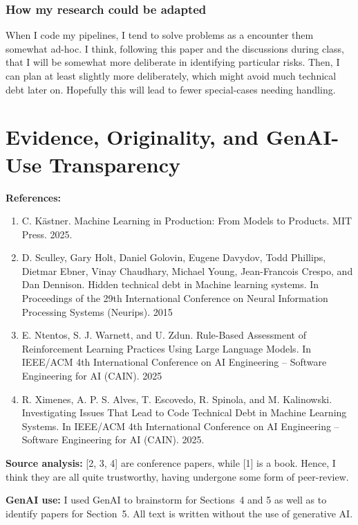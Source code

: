 \documentclass[11pt]{article}
\begin{document}
\subsubsection{How my research could be adapted}

When I code my pipelines, I tend to solve problems as a encounter them somewhat ad-hoc. I think, following this paper and the discussions during class, that I will be somewhat more deliberate in identifying particular risks. Then, I can plan at least slightly more deliberately, which might avoid much technical debt later on. Hopefully this will lead to fewer special-cases needing handling. 

\section{Evidence, Originality, and GenAI-Use Transparency}

\textbf{References:}
\begin{enumerate}
    \item C. Kästner. Machine Learning in Production: From Models to Products. MIT Press. 2025.  
    \item D. Sculley, Gary Holt, Daniel Golovin, Eugene Davydov, Todd Phillips, Dietmar Ebner, Vinay Chaudhary, Michael Young, Jean-Francois Crespo, and Dan Dennison. Hidden technical debt in Machine learning systems. In Proceedings of the 29th International Conference on Neural Information Processing Systems (Neurips). 2015
    \item E. Ntentos, S. J. Warnett, and U. Zdun. Rule-Based Assessment of Reinforcement Learning Practices Using Large Language Models. In IEEE/ACM 4th International Conference on AI Engineering – Software Engineering for AI (CAIN). 2025
    \item R. Ximenes, A. P. S. Alves, T. Escovedo, R. Spinola, and M. Kalinowski. Investigating Issues That Lead to Code Technical Debt in Machine Learning Systems. In IEEE/ACM 4th International Conference on AI Engineering – Software Engineering for AI (CAIN). 2025.
\end{enumerate}
\textbf{Source analysis:} [2, 3, 4] are conference papers, while [1] is a book. Hence, I think they are all quite trustworthy, having undergone some form of peer-review. 

\textbf{GenAI use:} I used GenAI to brainstorm for Sections~4 and 5 as well as to identify papers for Section~5. All text is written without the use of generative AI. 
\end{document}
